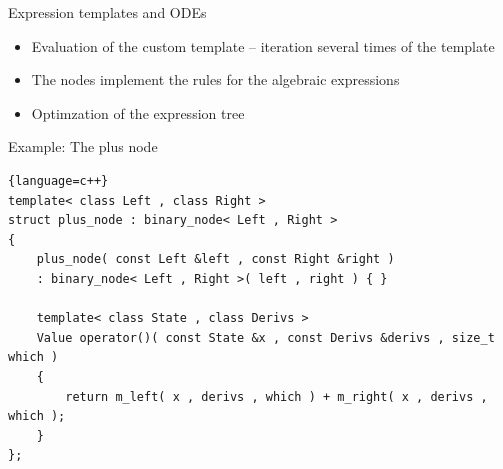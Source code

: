 \documentclass{beamer}
\begin{document}
\begin{frame}[fragile]{Expression templates and ODEs}

\begin{itemize}
  \item Evaluation of the custom template -- iteration several times of the template
  \item The nodes implement the rules for the algebraic expressions
  \item Optimzation of the expression tree \hspace{2ex} 
\end{itemize}

\vspace{2ex}

Example: The plus node
\begin{lstlisting}{language=c++}
template< class Left , class Right >
struct plus_node : binary_node< Left , Right >
{
    plus_node( const Left &left , const Right &right )
    : binary_node< Left , Right >( left , right ) { }

    template< class State , class Derivs >
    Value operator()( const State &x , const Derivs &derivs , size_t which )
    {
        return m_left( x , derivs , which ) + m_right( x , derivs , which );
    }
};
\end{lstlisting}
 
\end{frame}
\end{document}
